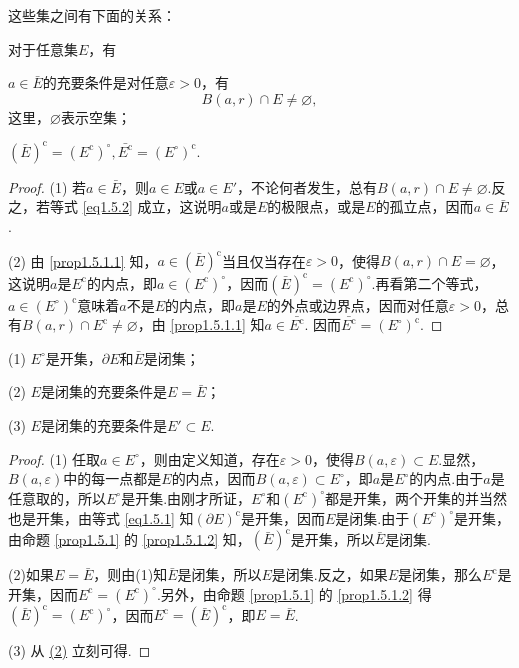 这些集之间有下面的关系：
\begin{prop}\label{prop1.5.1}
  对于任意集$E$，有
  \begin{eenum}
    \item $a\in\bar E$的充要条件是对任意$\varepsilon>0$，有\label{prop1.5.1.1}
    \begin{equation}\label{eq1.5.2}
       B(a,r)\cap E\ne\varnothing,
    \end{equation}
    这里，$\varnothing$表示空集；
    \item $(\bar E)^{\mathrm c}=(E^{\mathrm c})^\circ,\bar {E^{\mathrm c}}=(E^\circ)^{\mathrm c}$.\label{prop1.5.1.2}
  \end{eenum}
\end{prop}
\begin{proof}
(1) 若$a\in\bar E$，则$a\in E$或$a\in E'$，不论何者发生，总有$B(a,r)\cap E\ne\varnothing$.反之，若等式 \eqref{eq1.5.2} 成立，这说明$a$或是$E$的极限点，或是$E$的孤立点，因而$a\in\bar E$.

(2) 由 \ref{prop1.5.1.1} 知，$a\in(\bar E)^{\mathrm c}$当且仅当存在$\varepsilon>0$，使得$B(a,r)\cap E=\varnothing$，这说明$a$是$E^{\mathrm c}$的内点，即$a\in (E^{\mathrm c})^\circ$，因而$(\bar E)^{\mathrm c}=(E^{\mathrm c})^\circ$.再看第二个等式，$a\in (E^\circ)^{\mathrm c}$意味着$a$不是$E$的内点，即$a$是$E$的外点或边界点，因而对任意$\varepsilon>0$，总有$B(a,r)\cap E^{\mathrm c}\ne\varnothing$，由 \ref{prop1.5.1.1} 知$a\in \bar{E^{\mathrm c}}$. 因而$\bar {E^{\mathrm c}}=(E^\circ)^{\mathrm c}$.
\end{proof}

\begin{prop}\label{prop1.5.2}
  (1) \hypertarget{prop1.5.2.1}{}$E^\circ$是开集，$\partial E$和$\bar E$是闭集；\par
  (2) \hypertarget{prop1.5.2.2}{}$E$是闭集的充要条件是$E=\bar E$；\par
  (3) \hypertarget{prop1.5.2.3}{}$E$是闭集的充要条件是$E'\subset E$.
\end{prop}
\begin{proof}
  (1) 任取$a\in E^\circ$，则由定义知道，存在$\varepsilon>0$，使得$B(a,\varepsilon)\subset E$.显然，$B(a,\varepsilon)$中的每一点都是$E$的内点，因而$B(a,\varepsilon)\subset E^\circ$，即$a$是$E^\circ$的内点.由于$a$是任意取的，所以$E^\circ$是开集.由刚才所证，$E^\circ$和$(E^{\mathrm c})^\circ$都是开集，两个开集的并当然也是开集，由等式 \eqref{eq1.5.1} 知$(\partial E)^{\mathrm c}$是开集，因而$E$是闭集.由于$(E^{\mathrm c})^\circ$是开集，由命题 \ref{prop1.5.1} 的 \ref{prop1.5.1.2}  知，$(\bar E)^{\mathrm c}$是开集，所以$\bar E$是闭集.
  \par
  (2)如果$E=\bar E$，则由(1)知$\bar E$是闭集，所以$E$是闭集.反之，如果$E$是闭集，那么$E^{\mathrm c}$是开集，因而$E^{\mathrm c}=(E^{\mathrm c})^\circ$.另外，由命题 \ref{prop1.5.1} 的 \ref{prop1.5.1.2} 得$(\bar E)^{\mathrm c}=(E^{\mathrm c})^\circ$，因而$E^{\mathrm c}=(\bar E)^{\mathrm c}$，即$E=\bar E$.
  \par
  (3) 从 \hyperlink{prop1.5.2.2}{(2)} 立刻可得.
\end{proof}

